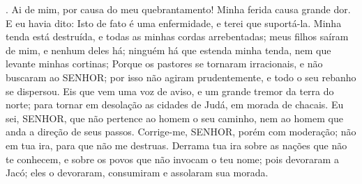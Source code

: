 {{}
{} .
Ai de mim, por causa do meu quebrantamento! Minha ferida
{} causa grande dor. E eu havia dito: Isto de fato é uma enfermidade, e terei que suportá-la.
Minha tenda está destruída, e todas as minhas cordas arrebentadas; meus filhos saíram
{} de mim, e nenhum deles há; ninguém há que estenda minha tenda, nem que levante minhas cortinas;
Porque os pastores se tornaram irracionais, e não buscaram ao SENHOR; por isso não agiram prudentemente,
 e todo o seu rebanho se dispersou.
Eis que vem uma voz de aviso, e um grande tremor da terra do norte; para tornar em desolação as cidades de Judá, em morada de chacais.
Eu sei, SENHOR, que não pertence ao homem o seu caminho, nem ao homem que anda a direção de seus passos.
Corrige-me, SENHOR, porém com moderação;
 não em tua ira, para que não me destruas.
Derrama tua ira sobre as nações que não te conhecem, e sobre os povos que não invocam o teu nome; pois devoraram a Jacó; eles o devoraram, consumiram e assolaram sua morada.

\par }

